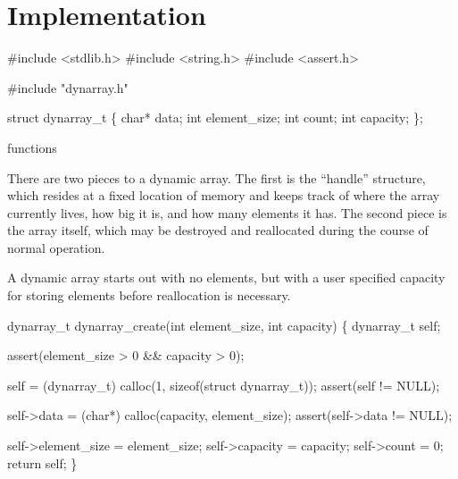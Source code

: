 \section{Implementation}

\nwenddocs{}\endmoddef
#include <stdlib.h>
#include <string.h>
#include <assert.h>

#include "dynarray.h"

struct dynarray_t \{
    char*  data;
    int    element_size;
    int    count;
    int    capacity;
\};

\LA{}functions~{\nwtagstyle{}}\RA{}
\nwendcode{}\nwdocspar

There are two pieces to a dynamic array.  The first is the ``handle''
structure, which resides at a fixed location of memory and keeps
track of where the array currently lives, how big it is, and how
many elements it has.  The second piece is the array itself, which
may be destroyed and reallocated during the course of normal
operation.

A dynamic array starts out with no elements, but with a user
specified capacity for storing elements before reallocation
is necessary.

\nwenddocs{}\endmoddef
dynarray_t dynarray_create(int element_size, int capacity)
\{
    dynarray_t self;

    assert(element_size > 0 && capacity > 0);

    self = (dynarray_t) calloc(1, sizeof(struct dynarray_t));
    assert(self != NULL);

    self->data = (char*) calloc(capacity, element_size);
    assert(self->data != NULL);

    self->element_size = element_size;
    self->capacity = capacity;
    self->count = 0;
    return self;
\}

\nwendcode{}\nwdocspar

